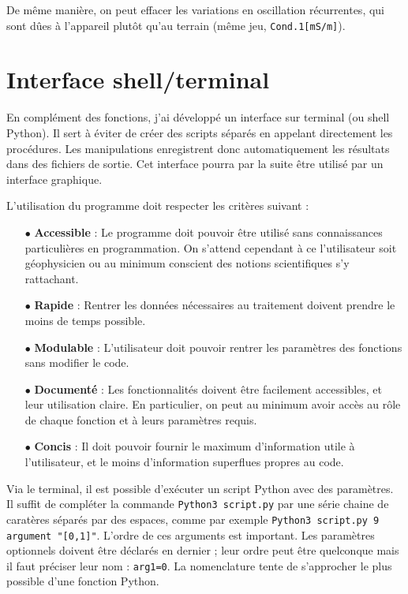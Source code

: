 \documentclass[12pt]{article}
\begin{document}
    De même manière, on peut effacer les variations en oscillation récurrentes, qui sont dûes à l'appareil plutôt qu'au terrain (même jeu, \texttt{Cond.1[mS/m]}).

\newpage
\section{Interface shell/terminal}

    En complément des fonctions, j'ai développé un interface sur terminal (ou shell Python). Il sert à éviter de créer des scripts séparés en appelant directement les procédures. Les manipulations enregistrent donc automatiquement les résultats dans des fichiers de sortie. Cet interface pourra par la suite être utilisé par un interface graphique.
    
    L'utilisation du programme doit respecter les critères suivant :
    \begin{enumerate}
        \item[$\bullet$] \textbf{Accessible} : Le programme doit pouvoir être utilisé sans connaissances particulières en programmation. On s'attend cependant à ce l'utilisateur soit géophysicien ou au minimum conscient des notions scientifiques  s'y rattachant.
        \item[$\bullet$] \textbf{Rapide} : Rentrer les données nécessaires au traitement doivent prendre le moins de temps possible.
        \item[$\bullet$] \textbf{Modulable} : L'utilisateur doit pouvoir rentrer les paramètres des fonctions sans modifier le code.
        \item[$\bullet$] \textbf{Documenté} : Les fonctionnalités doivent être facilement accessibles, et leur utilisation claire. En particulier, on peut au minimum avoir accès au rôle de chaque fonction et à leurs paramètres requis.
        \item[$\bullet$] \textbf{Concis} : Il doit pouvoir fournir le maximum d'information utile à l'utilisateur, et le moins d'information superflues propres au code.
    \end{enumerate}

    Via le terminal, il est possible d'exécuter un script Python avec des paramètres. Il suffit de compléter la commande \texttt{Python3 script.py} par une série chaine de caratères séparés par des espaces, comme par exemple \texttt{Python3 script.py 9 argument "[0,1]"}. L'ordre de ces arguments est important. Les paramètres optionnels doivent être déclarés en dernier ; leur ordre peut être quelconque mais il faut préciser leur nom : \texttt{arg1=0}. La nomenclature tente de s'approcher le plus possible d'une fonction Python.
\end{document}
